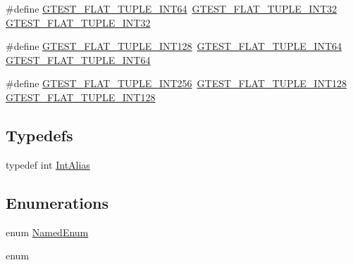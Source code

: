 \begin{DoxyCompactItemize}
\item 
\#define \mbox{\hyperlink{googletest-master_2googletest_2test_2gtest__unittest_8cc_a505487ba755aefa89ddfdc9127621c11}{G\+T\+E\+S\+T\+\_\+\+F\+L\+A\+T\+\_\+\+T\+U\+P\+L\+E\+\_\+\+I\+N\+T64}}~\mbox{\hyperlink{_obj__test_2lib_2googletest-master_2googletest_2test_2gtest__unittest_8cc_a1c7baa94acbbb0d0ef250772fdad3972}{G\+T\+E\+S\+T\+\_\+\+F\+L\+A\+T\+\_\+\+T\+U\+P\+L\+E\+\_\+\+I\+N\+T32}} \mbox{\hyperlink{_obj__test_2lib_2googletest-master_2googletest_2test_2gtest__unittest_8cc_a1c7baa94acbbb0d0ef250772fdad3972}{G\+T\+E\+S\+T\+\_\+\+F\+L\+A\+T\+\_\+\+T\+U\+P\+L\+E\+\_\+\+I\+N\+T32}}
\item 
\#define \mbox{\hyperlink{googletest-master_2googletest_2test_2gtest__unittest_8cc_a0ff3eef0b1e2abfee41bdab9631f41ae}{G\+T\+E\+S\+T\+\_\+\+F\+L\+A\+T\+\_\+\+T\+U\+P\+L\+E\+\_\+\+I\+N\+T128}}~\mbox{\hyperlink{_obj__test_2lib_2googletest-master_2googletest_2test_2gtest__unittest_8cc_a505487ba755aefa89ddfdc9127621c11}{G\+T\+E\+S\+T\+\_\+\+F\+L\+A\+T\+\_\+\+T\+U\+P\+L\+E\+\_\+\+I\+N\+T64}} \mbox{\hyperlink{_obj__test_2lib_2googletest-master_2googletest_2test_2gtest__unittest_8cc_a505487ba755aefa89ddfdc9127621c11}{G\+T\+E\+S\+T\+\_\+\+F\+L\+A\+T\+\_\+\+T\+U\+P\+L\+E\+\_\+\+I\+N\+T64}}
\item 
\#define \mbox{\hyperlink{googletest-master_2googletest_2test_2gtest__unittest_8cc_ac53eae6d18fe053245d04c88c2122882}{G\+T\+E\+S\+T\+\_\+\+F\+L\+A\+T\+\_\+\+T\+U\+P\+L\+E\+\_\+\+I\+N\+T256}}~\mbox{\hyperlink{_obj__test_2lib_2googletest-master_2googletest_2test_2gtest__unittest_8cc_a0ff3eef0b1e2abfee41bdab9631f41ae}{G\+T\+E\+S\+T\+\_\+\+F\+L\+A\+T\+\_\+\+T\+U\+P\+L\+E\+\_\+\+I\+N\+T128}} \mbox{\hyperlink{_obj__test_2lib_2googletest-master_2googletest_2test_2gtest__unittest_8cc_a0ff3eef0b1e2abfee41bdab9631f41ae}{G\+T\+E\+S\+T\+\_\+\+F\+L\+A\+T\+\_\+\+T\+U\+P\+L\+E\+\_\+\+I\+N\+T128}}
\end{DoxyCompactItemize}
\subsection*{Typedefs}
\begin{DoxyCompactItemize}
\item 
typedef int \mbox{\hyperlink{googletest-master_2googletest_2test_2gtest__unittest_8cc_a89319972d5a831dd6877a3e502ec57ff}{Int\+Alias}}
\end{DoxyCompactItemize}
\subsection*{Enumerations}
\begin{DoxyCompactItemize}
\item 
enum \mbox{\hyperlink{googletest-master_2googletest_2test_2gtest__unittest_8cc_ae0610bad70a3b53c94ee9db54f6f732b}{Named\+Enum}} 
\item 
enum 
\end{DoxyCompactItemize}
